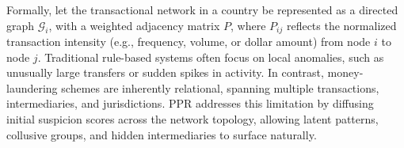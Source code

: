 \documentclass[11pt,english]{article}
\begin{document}
Formally, let the transactional network in a country be represented as a directed graph $\mathcal{G}_i$, with a weighted adjacency matrix $P$, where $P_{ij}$ reflects the normalized transaction intensity (e.g., frequency, volume, or dollar amount) from node $i$ to node $j$. Traditional rule-based systems often focus on local anomalies, such as unusually large transfers or sudden spikes in activity. In contrast, money-laundering schemes are inherently relational, spanning multiple transactions, intermediaries, and jurisdictions. PPR addresses this limitation by diffusing initial suspicion scores across the network topology, allowing latent patterns, collusive groups, and hidden intermediaries to surface naturally.
\end{document}
